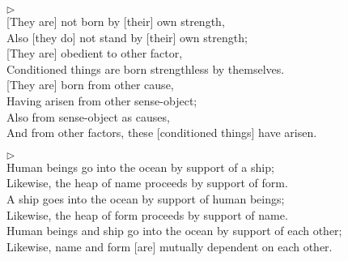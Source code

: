 \addtocounter{sennum}{-1}
$\triangleright$  \\
{[They are]} not born by [their] own strength,\\
Also [they do] not stand by [their] own strength;\\
{[They are]} obedient to other factor,\\
Conditioned things are born strengthless by themselves.\\[1.5mm]
{[They are]} born from other cause,\\
Having arisen from other sense-object;\\
Also from sense-object as causes,\\
And from other factors, these [conditioned things] have arisen.\\


\addtocounter{sennum}{-1}
$\triangleright$  \\
Human beings go into the ocean by support of a ship;\\
Likewise, the heap of name proceeds by support of form.\\
A ship goes into the ocean by support of human beings;\\
Likewise, the heap of form proceeds by support of name.\\
Human beings and ship go into the ocean by support of each other;\\
Likewise, name and form [are] mutually dependent on each other.\\


